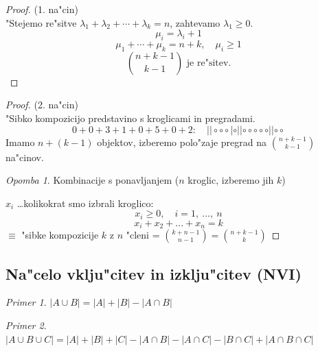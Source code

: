 \documentclass[a4paper,12pt]{article}
\theoremstyle{definition}
\theoremstyle{remark}
\newtheorem*{ex}{Primer}
\newtheorem*{rem}{Opomba}
\begin{document}
\begin{proof}(1. na"cin)\\
	"Stejemo re"sitve $\lambda_1 + \lambda_2 + \cdots + \lambda_k = n$, zahtevamo $\lambda_1 \geqslant 0$.
	\[\mu_i = \lambda_i + 1\]
	\[\mu_1 + \cdots + \mu_k = n + k,\quad \mu_i \geqslant 1\]
	\[\binom{n+k-1}{k-1} \text{ je re"sitev.}\]
\end{proof}
\begin{proof}(2. na"cin)\\
	"Sibko kompozicijo predstavino s kroglicami in pregradami.
	\[0 + 0 + 3 + 1 + 0 + 5 + 0 + 2:\quad ||\circ \circ \circ|\circ||\circ \circ \circ \circ \circ||\circ \circ\]
	Imamo $n + (k - 1)$ objektov, izberemo polo"zaje pregrad na $\binom{n + k - 1}{k - 1}$ na"cinov.\\
	\begin{rem}
		Kombinacije s ponavljanjem ($n$ kroglic, izberemo jih $k$)
	\end{rem}
	$x_i$ \ldots kolikokrat smo izbrali kroglico:
	\[x_i \geqslant 0, \quad i = 1, \ ..., \ n\]
	\[x_i + x_2 + ... + x_n = k\]
	$\equiv$ "sibke kompozicije $k$ z $n$ "cleni = $\binom{k + n - 1}{n - 1} = \binom{n + k - 1}{k}$
\end{proof}

\subsection{Na"celo vklju"citev in izklju"citev (NVI)}
\begin{ex}
	$|A \cup B| = |A| + |B| - |A \cap B|$
	\label{TODO: add image 2}
\end{ex}
\begin{ex}
	$|A \cup B \cup C| = |A| + |B| + |C| - |A \cap B| - |A \cap C| - |B \cap C| + |A \cap B \cap C|$
	\label{TODO: add image 3}
\end{ex}
\end{document}
